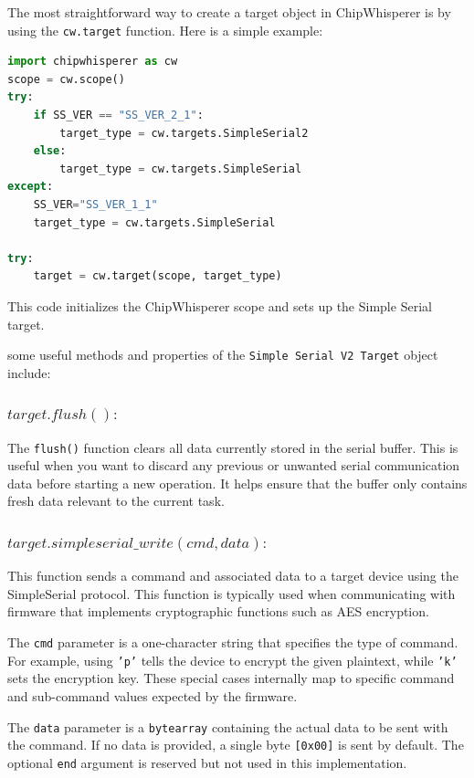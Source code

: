 The most straightforward way to create a target object in ChipWhisperer is by using the \texttt{cw.target} function. Here is a simple example:

\begin{lstlisting}[language=Python]
import chipwhisperer as cw
scope = cw.scope()
try:
    if SS_VER == "SS_VER_2_1":
        target_type = cw.targets.SimpleSerial2
    else:
        target_type = cw.targets.SimpleSerial
except:
    SS_VER="SS_VER_1_1"
    target_type = cw.targets.SimpleSerial

try:
    target = cw.target(scope, target_type)
\end{lstlisting}

This code initializes the ChipWhisperer scope and sets up the Simple Serial target.

some useful methods and properties of the \texttt{Simple Serial V2 Target} object include:
\subsubsection{$target.flush() :$}
The \texttt{flush()} function clears all data currently stored in the serial buffer. This is useful when you want to discard any previous or unwanted serial communication data before starting a new operation. It helps ensure that the buffer only contains fresh data relevant to the current task.

\subsubsection{$target.simpleserial\_write(cmd, data) :$}
This function sends a command and associated data to a target device using the SimpleSerial protocol. This function is typically used when communicating with firmware that implements cryptographic functions such as AES encryption. 

The \texttt{cmd} parameter is a one-character string that specifies the type of command. For example, using \texttt{'p'} tells the device to encrypt the given plaintext, while \texttt{'k'} sets the encryption key. These special cases internally map to specific command and sub-command values expected by the firmware.

The \texttt{data} parameter is a \texttt{bytearray} containing the actual data to be sent with the command. If no data is provided, a single byte \texttt{[0x00]} is sent by default. The optional \texttt{end} argument is reserved but not used in this implementation.

